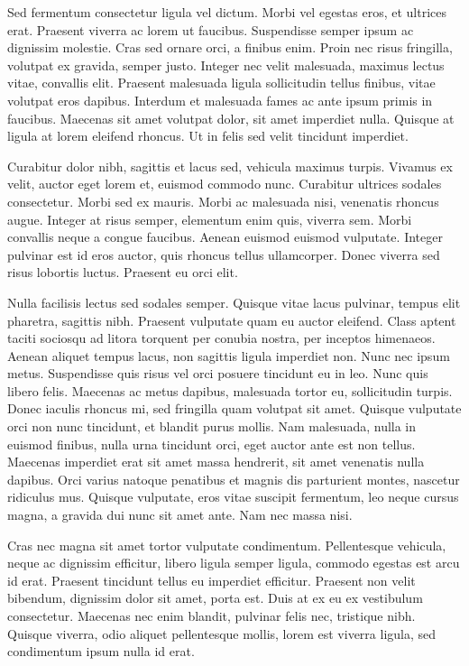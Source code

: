 Sed fermentum consectetur ligula vel dictum. Morbi vel egestas eros, et ultrices erat. Praesent viverra ac lorem ut faucibus. Suspendisse semper ipsum ac dignissim molestie. Cras sed ornare orci, a finibus enim. Proin nec risus fringilla, volutpat ex gravida, semper justo. Integer nec velit malesuada, maximus lectus vitae, convallis elit. Praesent malesuada ligula sollicitudin tellus finibus, vitae volutpat eros dapibus. Interdum et malesuada fames ac ante ipsum primis in faucibus. Maecenas sit amet volutpat dolor, sit amet imperdiet nulla. Quisque at ligula at lorem eleifend rhoncus. Ut in felis sed velit tincidunt imperdiet.

Curabitur dolor nibh, sagittis et lacus sed, vehicula maximus turpis. Vivamus ex velit, auctor eget lorem et, euismod commodo nunc. Curabitur ultrices sodales consectetur. Morbi sed ex mauris. Morbi ac malesuada nisi, venenatis rhoncus augue. Integer at risus semper, elementum enim quis, viverra sem. Morbi convallis neque a congue faucibus. Aenean euismod euismod vulputate. Integer pulvinar est id eros auctor, quis rhoncus tellus ullamcorper. Donec viverra sed risus lobortis luctus. Praesent eu orci elit.

Nulla facilisis lectus sed sodales semper. Quisque vitae lacus pulvinar, tempus elit pharetra, sagittis nibh. Praesent vulputate quam eu auctor eleifend. Class aptent taciti sociosqu ad litora torquent per conubia nostra, per inceptos himenaeos. Aenean aliquet tempus lacus, non sagittis ligula imperdiet non. Nunc nec ipsum metus. Suspendisse quis risus vel orci posuere tincidunt eu in leo. Nunc quis libero felis. Maecenas ac metus dapibus, malesuada tortor eu, sollicitudin turpis. Donec iaculis rhoncus mi, sed fringilla quam volutpat sit amet. Quisque vulputate orci non nunc tincidunt, et blandit purus mollis. Nam malesuada, nulla in euismod finibus, nulla urna tincidunt orci, eget auctor ante est non tellus. Maecenas imperdiet erat sit amet massa hendrerit, sit amet venenatis nulla dapibus. Orci varius natoque penatibus et magnis dis parturient montes, nascetur ridiculus mus. Quisque vulputate, eros vitae suscipit fermentum, leo neque cursus magna, a gravida dui nunc sit amet ante. Nam nec massa nisi.

Cras nec magna sit amet tortor vulputate condimentum. Pellentesque vehicula, neque ac dignissim efficitur, libero ligula semper ligula, commodo egestas est arcu id erat. Praesent tincidunt tellus eu imperdiet efficitur. Praesent non velit bibendum, dignissim dolor sit amet, porta est. Duis at ex eu ex vestibulum consectetur. Maecenas nec enim blandit, pulvinar felis nec, tristique nibh. Quisque viverra, odio aliquet pellentesque mollis, lorem est viverra ligula, sed condimentum ipsum nulla id erat.

